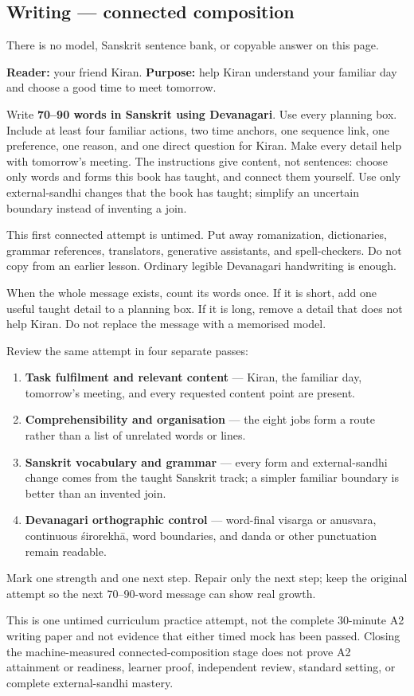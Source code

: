 \subsection*{Writing — connected composition}
There is no model, Sanskrit sentence bank, or copyable answer on this page.

\textbf{Reader:} your friend Kiran. \textbf{Purpose:} help Kiran understand your familiar day and choose a good time to meet tomorrow.

Write \textbf{70–90 words in Sanskrit using Devanagari}. Use every planning box. Include at least four familiar actions, two time anchors, one sequence link, one preference, one reason, and one direct question for Kiran. Make every detail help with tomorrow's meeting. The instructions give content, not sentences: choose only words and forms this book has taught, and connect them yourself. Use only external-sandhi changes that the book has taught; simplify an uncertain boundary instead of inventing a join.

This first connected attempt is untimed. Put away romanization, dictionaries, grammar references, translators, generative assistants, and spell-checkers. Do not copy from an earlier lesson. Ordinary legible Devanagari handwriting is enough.

When the whole message exists, count its words once. If it is short, add one useful taught detail to a planning box. If it is long, remove a detail that does not help Kiran. Do not replace the message with a memorised model.

\begin{tcolorbox}[breakable,colback=teal!4,colframe=teal!35!black,title={Before you move on}]
Review the same attempt in four separate passes:

\begin{enumerate}
\raggedright
  \item \textbf{Task fulfilment and relevant content} — Kiran, the familiar day, tomorrow's meeting, and every requested content point are present.
  \item \textbf{Comprehensibility and organisation} — the eight jobs form a route rather than a list of unrelated words or lines.
  \item \textbf{Sanskrit vocabulary and grammar} — every form and external-sandhi change comes from the taught Sanskrit track; a simpler familiar boundary is better than an invented join.
  \item \textbf{Devanagari orthographic control} — word-final visarga or anusvara, continuous śirorekhā, word boundaries, and danda or other punctuation remain readable.
\end{enumerate}

Mark one strength and one next step. Repair only the next step; keep the original attempt so the next 70–90-word message can show real growth.

This is one untimed curriculum practice attempt, not the complete 30-minute A2 writing paper and not evidence that either timed mock has been passed. Closing the machine-measured connected-composition stage does not prove A2 attainment or readiness, learner proof, independent review, standard setting, or complete external-sandhi mastery.
\end{tcolorbox}
